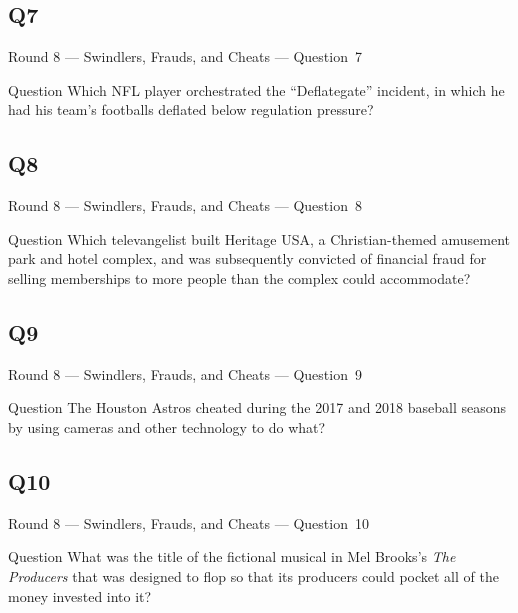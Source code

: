 \documentclass[11pt]{beamer}
\begin{document}
\subsection*{Q7}
\begin{frame}[t]{Round 8 --- Swindlers, Frauds, and Cheats --- \mbox{Question 7}}
\vspace{-0.5em}
\begin{block}{Question}
Which NFL player orchestrated the ``Deflategate'' incident, in which he had his team's footballs deflated below regulation pressure?
\end{block}
\end{frame}
\subsection*{Q8}
\begin{frame}[t]{Round 8 --- Swindlers, Frauds, and Cheats --- \mbox{Question 8}}
\vspace{-0.5em}
\begin{block}{Question}
Which televangelist built Heritage USA, a Christian-themed amusement park and hotel complex, and was subsequently convicted of financial fraud for selling memberships to more people than the complex could accommodate?
\end{block}
\end{frame}
\subsection*{Q9}
\begin{frame}[t]{Round 8 --- Swindlers, Frauds, and Cheats --- \mbox{Question 9}}
\vspace{-0.5em}
\begin{block}{Question}
The Houston Astros cheated during the 2017 and 2018 baseball seasons by using cameras and other technology to do what?
\end{block}
\end{frame}
\subsection*{Q10}
\begin{frame}[t]{Round 8 --- Swindlers, Frauds, and Cheats --- \mbox{Question 10}}
\vspace{-0.5em}
\begin{block}{Question}
What was the title of the fictional musical in Mel Brooks's \emph{The Producers} that was designed to flop so that its producers could pocket all of the money invested into it?
\end{block}
\end{frame}
\end{document}
